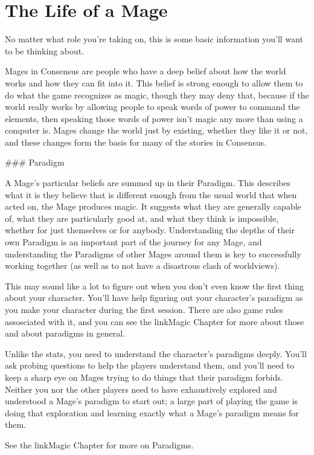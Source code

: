 \documentclass[
  oneside,
  statementpaper,
  9pt]{memoir}
\begin{document}
\hypertarget{the-life-of-a-mage}{%
\section{The Life of a Mage}\label{the-life-of-a-mage}}

\begin{Narrator}

No matter what role you're taking on, this is some basic information you'll want to be thinking about.

Mages in Consensus are people who have a deep belief about how the world works and how they can fit into it. This belief is strong enough to allow them to do what the game recognizes as magic, though they may deny that, because if the world really works by allowing people to speak words of power to command the elements, then speaking those words of power isn’t magic any more than using a computer is. Mages change the world just by existing, whether they like it or not, and these changes form the basis for many of the stories in Consensus.

### Paradigm

A Mage’s particular beliefs are summed up in their Paradigm. This describes what it is they believe that is different enough from the usual world that when acted on, the Mage produces magic. It suggests what they are generally capable of, what they are particularly good at, and what they think is impossible, whether for just themselves or for anybody. Understanding the depths of their own Paradigm is an important part of the journey for any Mage, and understanding the Paradigms of other Mages around them is key to successfully working together (as well as to not have a disastrous clash of worldviews).

\end{Narrator}

\begin{Player}

This may sound like a lot to figure out when you don't even know the first thing about your character. You'll have help figuring out your character's paradigm as you make your character during the first session. There are also game rules assosciated with it, and you can see the {{linkMagic Chapter}} for more about those and about paradigms in general.

\end{Player}

\begin{MC}

Unlike the stats, you need to understand the character's paradigms deeply. You'll ask probing questions to help the players understand them, and you'll need to keep a sharp eye on Mages trying to do things that their paradigm forbids. Neither you nor the other players need to have exhaustively explored and understood a Mage's paradigm to start out; a large part of playing the game is doing that exploration and learning exactly what a Mage's paradigm means for them.

See the {{linkMagic Chapter}} for more on Paradigms.

\end{MC}
\end{document}
